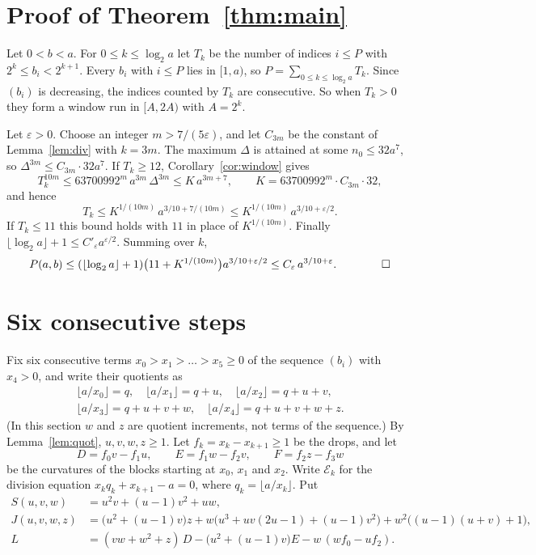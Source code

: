 \documentclass[11pt]{amsart}
\theoremstyle{definition}
\theoremstyle{remark}
\begin{document}
\section{Proof of Theorem~\ref{thm:main}}

Let $0<b<a$. For $0\le k\le\log_2 a$ let $T_k$ be the number of indices $i\le P$ with
$2^k\le b_i<2^{k+1}$. Every $b_i$ with $i\le P$ lies in $[1,a)$, so
$P=\sum_{0\le k\le \log_2 a}T_k$. Since $(b_i)$ is decreasing, the indices counted by $T_k$
are consecutive. So when $T_k>0$ they form a window run in $[A,2A)$ with $A=2^k$.

Let $\varepsilon>0$. Choose an integer $m>7/(5\varepsilon)$, and let $C_{3m}$ be the constant of
Lemma~\ref{lem:div} with $k=3m$. The maximum $\Delta$ is attained at some $n_0\le 32a^7$, so
$\Delta^{3m}\le C_{3m}\cdot 32a^7$. If $T_k\ge12$, Corollary~\ref{cor:window} gives
\[
T_k^{10m}\le 63700992^m\,a^{3m}\,\Delta^{3m}\le K\,a^{3m+7},\qquad K=63700992^m\cdot C_{3m}\cdot 32,
\]
and hence
\[
T_k\le K^{1/(10m)}\,a^{3/10+7/(10m)}\le K^{1/(10m)}\,a^{3/10+\varepsilon/2}.
\]
If $T_k\le11$ this bound holds with $11$ in place of $K^{1/(10m)}$. Finally
$\lfloor\log_2a\rfloor+1\le C'_\varepsilon a^{\varepsilon/2}$. Summing over $k$,
\[
P(a,b)\le (\lfloor\log_2 a\rfloor+1)\bigl(11+K^{1/(10m)}\bigr)a^{3/10+\varepsilon/2}
\le C_\varepsilon\, a^{3/10+\varepsilon}. \qquad\qed
\]

\section{Six consecutive steps}\label{sec:six}

Fix six consecutive terms $x_0>x_1>\dots>x_5\ge0$ of the sequence $(b_i)$ with $x_4>0$, and
write their quotients as
\begin{gather*}
\lfloor a/x_0\rfloor=q,\quad \lfloor a/x_1\rfloor=q+u,\quad \lfloor a/x_2\rfloor=q+u+v,\\
\lfloor a/x_3\rfloor=q+u+v+w,\quad \lfloor a/x_4\rfloor=q+u+v+w+z .
\end{gather*}
(In this section $w$ and $z$ are quotient increments, not terms of the sequence.) By
Lemma~\ref{lem:quot}, $u,v,w,z\ge1$. Let $f_k=x_k-x_{k+1}\ge1$ be the drops, and let
\[
D=f_0v-f_1u,\qquad E=f_1w-f_2v,\qquad F=f_2z-f_3w
\]
be the curvatures of the blocks starting at $x_0$, $x_1$ and $x_2$. Write $\mathcal E_k$ for the division
equation $x_kq_k+x_{k+1}-a=0$, where $q_k=\lfloor a/x_k\rfloor$. Put
\begin{align*}
S(u,v,w)&=u^2v+(u-1)v^2+uw,\\
J(u,v,w,z)&=\bigl(u^2+(u-1)v\bigr)z+w\bigl(u^3+uv(2u-1)+(u-1)v^2\bigr)+w^2\bigl((u-1)(u+v)+1\bigr),\\
L&=(vw+w^2+z)\,D-\bigl(u^2+(u-1)v\bigr)E-w\,(wf_0-uf_2).
\end{align*}
\end{document}

